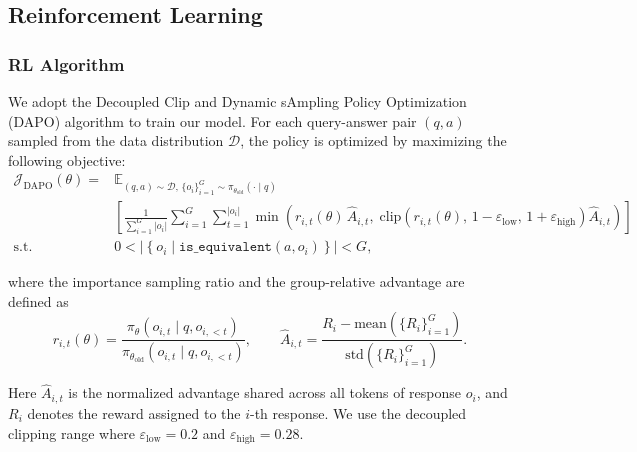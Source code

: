 \documentclass{huawei}
\begin{document}
\subsection{Reinforcement Learning}
\subsubsection{RL Algorithm}
We adopt the Decoupled Clip and Dynamic sAmpling Policy Optimization (DAPO) algorithm \cite{yu2026dapo} to train our model. For each query-answer pair $(q, a)$ sampled from the data distribution $\mathcal{D}$, the policy is optimized by maximizing the following objective:
\begin{equation}
\begin{aligned}
\mathcal{J}_{\text{DAPO}}(\theta) ={}& \mathbb{E}_{(q,a) \sim \mathcal{D},\, \{o_i\}_{i=1}^{G} \sim \pi_{\theta_{\text{old}}}(\cdot \mid q)} \\
& \left[ \frac{1}{\sum_{i=1}^{G} |o_i|} \sum_{i=1}^{G} \sum_{t=1}^{|o_i|} \min\!\left( r_{i,t}(\theta)\, \hat{A}_{i,t},\; \text{clip}\!\left( r_{i,t}(\theta),\, 1 - \varepsilon_{\text{low}},\, 1 + \varepsilon_{\text{high}} \right) \hat{A}_{i,t} \right) \right] \\
\text{s.t.} \quad & 0 < \left| \left\{ o_i \mid \texttt{is\_equivalent}(a, o_i) \right\} \right| < G,
\end{aligned}
\end{equation}

where the importance sampling ratio and the group-relative advantage are defined as
\begin{equation}        
r_{i,t}(\theta) = \frac{\pi_\theta(o_{i,t} \mid q, o_{i,<t})}{\pi_{\theta_{\text{old}}}(o_{i,t} \mid q, o_{i,<t})}, \qquad
\hat{A}_{i,t} = \frac{R_i - \text{mean}(\{R_i\}_{i=1}^{G})}{\text{std}(\{R_i\}_{i=1}^{G})}.
\end{equation}

Here $\hat{A}_{i,t}$ is the normalized advantage shared across all tokens of response $o_i$, and $R_i$ denotes the reward assigned to the $i$-th response.
We use the decoupled clipping range where $\varepsilon_{\text{low}}=0.2$ and $\varepsilon_{\text{high}}=0.28$.

\end{document}
